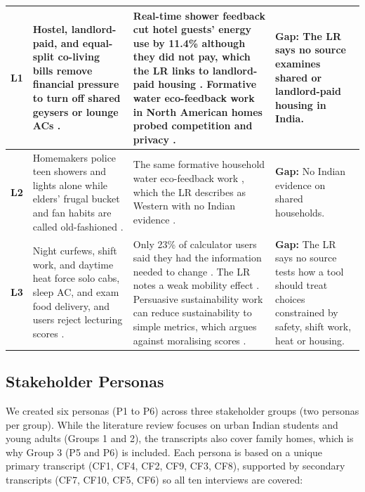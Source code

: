 \documentclass[12pt, a4paper]{article}
\begin{document}
\begin{longtable}{|>{\raggedright\arraybackslash}p{1.2cm}|>{\raggedright\arraybackslash}p{4.5cm}|>{\raggedright\arraybackslash}p{5.5cm}|>{\raggedright\arraybackslash}p{4.3cm}|}
\textbf{L1} & Hostel, landlord-paid, and equal-split co-living bills remove financial pressure to turn off shared geysers or lounge ACs \cite{cf1, cf7, cf10}. & Real-time shower feedback cut hotel guests' energy use by 11.4\% although they did not pay, which the LR links to landlord-paid housing \cite{tiefenbeck2019}. Formative water eco-feedback work in North American homes probed competition and privacy \cite{froehlich2012}. & \textbf{Gap:} The LR says no source examines shared or landlord-paid housing in India. \\
\hline

\textbf{L2} & Homemakers police teen showers and lights alone while elders' frugal bucket and fan habits are called old-fashioned \cite{cf1, cf3, cf5, cf6, cf8}. & The same formative household water eco-feedback work \cite{froehlich2012}, which the LR describes as Western with no Indian evidence \cite{froehlich2012, tiefenbeck2019}. & \textbf{Gap:} No Indian evidence on shared households. \\
\hline

\textbf{L3} & Night curfews, shift work, and daytime heat force solo cabs, sleep AC, and exam food delivery, and users reject lecturing scores \cite{cf1, cf2, cf4, cf5, cf9}. & Only 23\% of calculator users said they had the information needed to change \cite{collins2020}. The LR notes a weak mobility effect \cite{hoffmann2024}. Persuasive sustainability work can reduce sustainability to simple metrics, which argues against moralising scores \cite{brynjarsdottir2012}. & \textbf{Gap:} The LR says no source tests how a tool should treat choices constrained by safety, shift work, heat or housing. \\
\hline
\end{longtable}

\subsection{Stakeholder Personas}
We created six personas (P1 to P6) across three stakeholder groups (two personas per group). While the literature review focuses on urban Indian students and young adults (Groups 1 and 2), the transcripts also cover family homes, which is why Group 3 (P5 and P6) is included. Each persona is based on a unique primary transcript (CF1, CF4, CF2, CF9, CF3, CF8), supported by secondary transcripts (CF7, CF10, CF5, CF6) so all ten interviews are covered:
\end{document}

